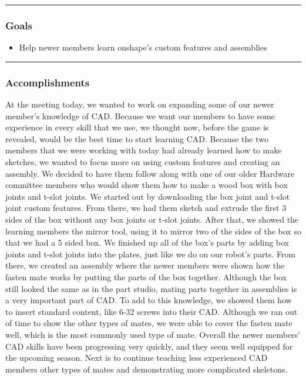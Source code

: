 \noindent\hfil\rule{\textwidth}{.4pt}\hfil
\subsubsection*{Goals}
\begin{itemize}
    \item Help newer members learn onshape’s custom features and assemblies
  

\end{itemize} 

\noindent\hfil\rule{\textwidth}{.4pt}\hfil

\subsubsection*{Accomplishments}
At the meeting today, we wanted to work on expanding some of our newer member’s knowledge of CAD. Because we want our members to have some experience in every skill that we use, we thought now, before the game is revealed, would be the best time to start learning CAD. Because the two members that we were working with today had already learned how to make sketches, we wanted to focus more on using custom features and creating an assembly. We decided to have them follow along with one of our older Hardware committee members who would show them how to make a wood box with box joints and t-slot joints. We started out by downloading the box joint and t-slot joint custom features. From there, we had them sketch and extrude the first 3 sides of the box without any box joints or t-slot joints. After that, we showed the learning members the mirror tool, using it to mirror two of the sides of the box so that we had a 5 sided box. We finished up all of the box’s parts by adding box joints and t-slot joints into the plates, just like we do on our robot’s parts. 
From there, we created an assembly where the newer members were shown how the fasten mate works by putting the parts of the box together. Although the box still looked the same as in the part studio, mating parts together in assemblies is a very important part of CAD. To add to this knowledge, we showed them how to insert standard content, like 6-32 screws into their CAD. Although we ran out of time to show the other types of mates, we were able to cover the fasten mate well, which is the most commonly used type of mate. Overall the newer members’ CAD skills have been progressing very quickly, and they seem well equipped for the upcoming season. Next is to continue teaching less experienced CAD members other types of mates
and demonstrating more complicated skeletons. 


